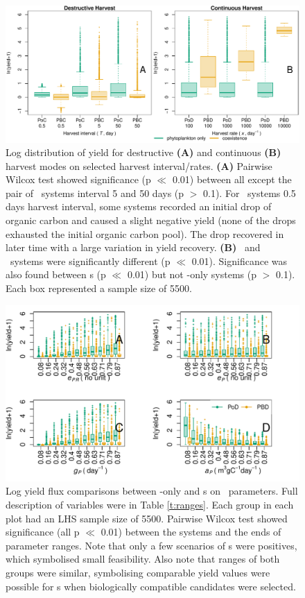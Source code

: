 \documentclass[../thesis.tex]{subfiles} %
\begin{document}
\begin{figure}[H]
    \centering
    \includegraphics[width=\linewidth]{result/Harvest.pdf}
    \caption[Yield flux distribution by harvest mode]{Log distribution of yield for destructive \textbf{(A)} and continuous \textbf{(B)} harvest modes on selected harvest interval/rates.  \textbf{(A)} Pairwise Wilcox test showed significance (p $\ll$ 0.01) between all except the pair of \PoN\ systems interval 5 and 50 days (p $>$ 0.1).  For \PBN\ systems 0.5 days harvest interval, some systems recorded an initial drop of organic carbon and caused a slight negative yield (none of the drops exhausted the initial organic carbon pool).  The drop recovered in later time with a large variation in yield recovery.  \textbf{(B)} \PoH\ and \PBH\ systems were significantly different (p $\ll$ 0.01).  Significance was also found between \pbs s (p $\ll$ 0.01) but not \phy-only systems (p $>$ 0.1).  Each box represented a sample size of 5500.}
    \label{f:ydByHarv}
\end{figure}

\begin{figure}[H]
    \centering
    \includegraphics[width=\linewidth]{result/bacEff1.pdf}
    \caption[Log yield flux comparisons between \phy-only and \pbs s on \phy\ parameters]{Log yield flux comparisons between \phy-only and \pbs s on \phy\ parameters.  Full description of variables were in Table \ref{t:ranges}.  Each group in each plot had an LHS sample size of 5500.  Pairwise Wilcox test showed significance (all p $\ll$ 0.01) between the systems and the ends of parameter ranges.  Note that only a few scenarios of \pbs s were positives, which symbolised small feasibility.  Also note that ranges of both groups were similar, symbolising comparable yield values were possible for \pbs s when biologically compatible candidates were selected.}
    \label{f:bacEffect}
\end{figure}
\end{document}
